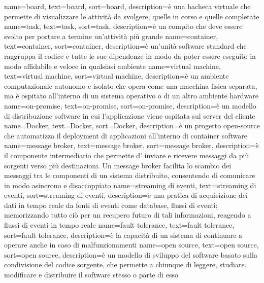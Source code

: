 {
    name={board},
    text=board,
    sort=board,
    description={è una bacheca virtuale che permette di visualizzare le attività da svolgere, quelle in corso e quelle completate}
}
{
    name={task},
    text=task,
    sort=task,
    description={è un compito che deve essere svolto per portare a termine un'attività più grande}
}
{
    name={container},
    text=container,
    sort=container,
    description={è un'unità software standard che raggruppa il codice e tutte le sue dipendenze in modo da poter essere eseguito in modo affidabile e veloce in qualsiasi ambiente}
}
{
    name={virtual machine},
    text=virtual machine,
    sort=virtual machine,
    description={è un ambiente computazionale autonomo e isolato che opera come una macchina fisica separata, ma è ospitato all'interno di un sistema operativo o di un altro ambiente hardware}
}
{
    name={on-promise},
    text=on-promise,
    sort=on-promise,
    description={è un modello di distribuzione software in cui l'applicazione viene ospitata sul server del cliente}
}
{
    name={Docker},
    text=Docker,
    sort=Docker,
    description={è un progetto open-source che automatizza il deployment di applicazioni all'interno di container software}
}
{
    name={message broker},
    text=message broker,
    sort=message broker,
    description={è il componente intermediario che permette d' inviare e ricevere messaggi da più sorgenti verso più destinazioni. Un message broker facilita lo scambio dei messaggi 
    tra le componenti di un sistema distribuito, consentendo di comunicare in modo asincrono e disaccoppiato}
}
{
    name={streaming di eventi},
    text=streaming di eventi,
    sort=streaming di eventi,
    description={è una pratica di acquisizione dei dati in tempo reale da fonti di eventi come database, flussi
    di eventi; memorizzando tutto ciò per un recupero futuro di tali informazioni, reagendo a
    flussi di eventi in tempo reale}
}
{
    name={fault tolerance},
    text=fault tolerance,
    sort=fault tolerance,
    description={è la capacità di un sistema di continuare a operare anche in caso di malfunzionamenti}
}
{
    name={open source},
    text=open source,
    sort=open source,
    description={è un modello di sviluppo del software basato sulla condivisione del codice sorgente, che permette a chiunque di leggere, studiare, modificare e distribuire il software stesso o parte di esso}
}
